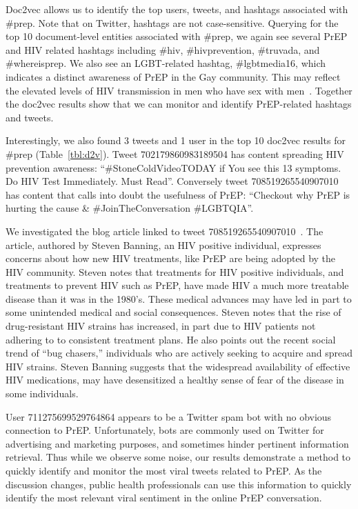 \documentclass[conference]{IEEEtran}
\begin{document}
Doc2vec allows us to identify the top users, tweets, and hashtags associated with \#prep. Note that on Twitter, hashtags are not case-sensitive. Querying for the top 10 document-level entities associated with \#prep, we again see several PrEP and HIV related hashtags including \#hiv, \#hivprevention, \#truvada, and \#whereisprep. We also see an LGBT-related hashtag, \#lgbtmedia16, which indicates a distinct awareness of PrEP in the Gay community. This may reflect the elevated levels of HIV transmission in men who have sex with men~\cite{centers2014hiv}. Together the doc2vec results show that we can monitor and identify PrEP-related hashtags and tweets.

Interestingly, we also found 3 tweets and 1 user in the top 10 doc2vec results for \#prep (Table~\ref{tbl:d2v}). Tweet 702179860983189504 has content spreading HIV prevention awareness: ``\#StoneColdVideoTODAY if You see this 13 symptoms. Do HIV Test Immediately. Must Read''. Conversely tweet 708519265540907010 has content that calls into doubt the usefulness of PrEP: ``Checkout why PrEP is hurting the cause \& \#JoinTheConversation \#LGBTQIA''.

We investigated the blog article linked to tweet 708519265540907010~\cite{prephurtingcause}. The article, authored by Steven Banning, an HIV positive individual, expresses concerns about how new HIV treatments, like PrEP are being adopted by the HIV community. Steven notes that treatments for HIV positive individuals, and treatments to prevent HIV such as PrEP, have made HIV a much more treatable disease than it was in the 1980's. These medical advances may have led in part to some unintended medical and social consequences. Steven notes that the rise of drug-resistant HIV strains has increased, in part due to HIV patients not adhering to to consistent treatment plans. He also points out the recent social trend of ``bug chasers,'' individuals who are actively seeking to acquire and spread HIV strains. Steven Banning suggests that the widespread availability of effective HIV medications, may have desensitized a healthy sense of fear of the disease in some individuals.

User 711275699529764864 appears to be a Twitter spam bot with no obvious connection to PrEP. Unfortunately, bots are commonly used on Twitter for advertising and marketing purposes, and sometimes hinder pertinent information retrieval. Thus while we observe some noise, our results demonstrate a method to quickly identify and monitor the most viral tweets related to PrEP. As the discussion changes, public health professionals can use this information to quickly identify the most relevant viral sentiment in the online PrEP conversation.
\end{document}
